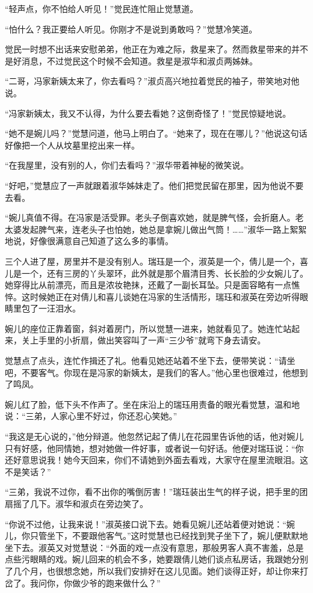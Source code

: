 \par “轻声点，你不怕给人听见！”觉民连忙阻止觉慧道。
\par “怕什么？我正要给人听见。你刚才不是说到勇敢吗？”觉慧冷笑道。
\par 觉民一时想不出话来安慰弟弟，他正在为难之际，救星来了。然而救星带来的并不是好消息，不过觉民这个时候不会知道。救星是淑华和淑贞两姊妹。
\par “二哥，冯家新姨太来了，你去看吗？”淑贞高兴地拉着觉民的袖子，带笑地对他说。
\par “冯家新姨太，我又不认得，为什么要去看她？这倒奇怪了！”觉民惊疑地说。
\par “她不是婉儿吗？”觉慧问道，他马上明白了。“她来了，现在在哪儿？”他说这句话好像把一个人从坟墓里挖出来一样。
\par “在我屋里，没有别的人，你们去看吗？”淑华带着神秘的微笑说。
\par “好吧，”觉慧应了一声就跟着淑华姊妹走了。他们把觉民留在那里，因为他说不要去看。
\par “婉儿真值不得。在冯家是活受罪。老头子倒喜欢她，就是脾气怪，会折磨人。老太婆发起脾气来，连老头子也怕她，她总是拿婉儿做出气筒！……”淑华一路上絮絮地说，好像很满意自己知道了这么多的事情。
\par 三个人进了屋，房里并不是没有别人。瑞珏是一个，淑英是一个，倩儿是一个，喜儿是一个，还有三房的丫头翠环，此外就是那个眉清目秀、长长脸的少女婉儿了。她穿得比从前漂亮，而且是浓妆艳抹，还戴了一副长耳坠。只是面容略有一点憔悴。这时候她正在对倩儿和喜儿谈她在冯家的生活情形，瑞珏和淑英在旁边听得眼睛里包了一汪泪水。
\par 婉儿的座位正靠着窗，斜对着房门，所以觉慧一进来，她就看见了。她连忙站起来，关上手里的小折扇，做出笑容叫了一声“三少爷”就弯下身去请安。
\par 觉慧点了点头，连忙作揖还了礼。他看见她还站着不坐下去，便带笑说：“请坐吧，不要客气。你现在是冯家的新姨太，是我们的客人。”他心里也很难过，他想到了鸣凤。
\par 婉儿红了脸，低下头不作声了。坐在床沿上的瑞珏用责备的眼光看觉慧，温和地说：“三弟，人家心里不好过，你还忍心笑她。”
\par “我这是无心说的，”他分辩道。他忽然记起了倩儿在花园里告诉他的话，他对婉儿只有好感，他同情她，想对她做一件好事，或者说一句好话。他便对瑞珏说：“你还好意思说我！她今天回来，你们不请她到外面去看戏，大家守在屋里流眼泪。这不是笑话？”
\par “三弟，我说不过你，看不出你的嘴倒厉害！”瑞珏装出生气的样子说，把手里的团扇摇了几下。淑华和淑贞在旁边笑了。
\par “你说不过他，让我来说！”淑英接口说下去。她看见婉儿还站着便对她说：“婉儿，你只管坐下，不要跟他客气。”这时觉慧也已经找到凳子坐下了，婉儿便默默地坐下去。淑英又对觉慧说：“外面的戏一点没有意思，那般男客人真不害羞，总是点些污眼睛的戏。婉儿回来的机会不多，她要跟倩儿她们谈点私房话，我跟她分别了几个月，也很想念她，所以我们安排好在这儿见面。她们谈得正好，却让你来打岔了。我问你，你做少爷的跑来做什么？”
